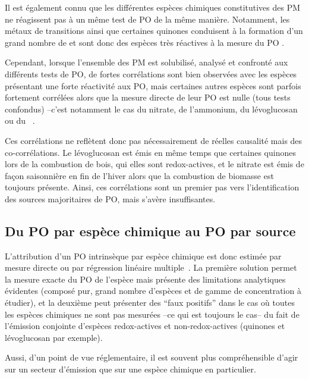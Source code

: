 Il est également connu que les différentes espèces chimiques constitutives des PM ne
réagissent pas à un même test de PO de la même manière. Notamment, les métaux de
transitions ainsi que certaines quinones conduisent à la formation d'un grand nombre de
 et sont donc des espèces très réactives à la mesure du PO
\autocite{charrierRates2015,calasImportance2017}.

Cependant, lorsque l'ensemble des PM est solubilisé, analysé et confronté aux différents tests de PO, de
fortes corrélations sont bien observées avec les espèces présentant une forte réactivité aux
PO, mais certaines autres espèces sont parfois fortement corrélées alors que la mesure directe de leur PO est nulle (tous tests confondus) --c'est notamment le cas du nitrate,
de l'ammonium, du lévoglucosan ou du ~\autocite{vermaRedox2009,calasComparison2018,calasSeasonal2019}.

Ces corrélations ne reflètent donc pas nécessairement de réelles causalité mais des
co-corrélations. Le lévoglucosan est émis en même temps que certaines quinones lors de la
combustion de bois, qui elles sont redox-actives, et le nitrate est émis de façon saisonnière en
fin de l'hiver alors que la combustion de biomasse est toujours présente.  Ainsi, ces
corrélations sont un premier pas vers l'identification des sources majoritaires de PO,
mais s'avère insuffisantes.

\subsection{Du PO par espèce chimique au PO par source}

L'attribution d'un PO intrinsèque par espèce chimique est donc estimée par mesure
directe ou par régression linéaire
multiple~\autocite{calasImportance2017,borlazaOxidative2018}. La première solution permet
la mesure exacte du PO de l'espèce mais présente des limitations analytiques évidentes
(composé pur, grand nombre d'espèces et de gamme de concentration à étudier), et la
deuxième peut présenter des ``faux positifs'' dans le cas où toutes les espèces chimiques
ne sont pas mesurées --ce qui est toujours le cas-- du fait de l'émission conjointe
d'espèces redox-actives et non-redox-actives (quinones et lévoglucosan par exemple).

Aussi, d'un point de vue réglementaire, il est souvent plus compréhensible d'agir sur
un secteur d'émission que sur une espèce chimique en particulier.


